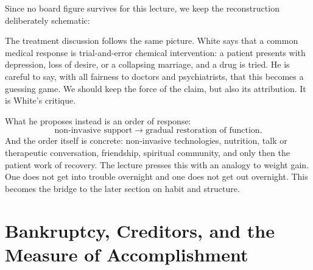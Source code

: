 Since no board figure survives for this lecture, we keep the reconstruction deliberately schematic:
\begin{figure}
\centering
{}
\end{figure}

The treatment discussion follows the same picture. White says that a common medical response is trial-and-error chemical intervention: a patient presents with depression, loss of desire, or a collapsing marriage, and a drug is tried. He is careful to say, with all fairness to doctors and psychiatrists, that this becomes a guessing game. We should keep the force of the claim, but also its attribution. It is White's critique.

What he proposes instead is an order of response:
\begin{equation}
\text{non-invasive support} \to \text{gradual restoration of function}.
\end{equation}
And the order itself is concrete: non-invasive technologies, nutrition, talk or therapeutic conversation, friendship, spiritual community, and only then the patient work of recovery. The lecture presses this with an analogy to weight gain. One does not get into trouble overnight and one does not get out overnight. This becomes the bridge to the later section on habit and structure.

\section{Bankruptcy, Creditors, and the Measure of Accomplishment}

